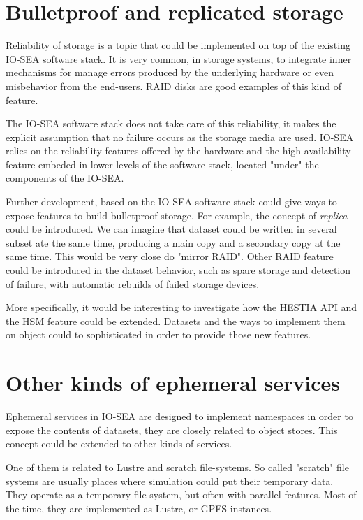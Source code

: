 \section{Bulletproof and replicated storage}

Reliability of storage is a topic that could be implemented on top of the existing IO-SEA software stack. It is
very common, in storage systems, to integrate inner mechanisms for manage errors produced by the underlying 
hardware or even misbehavior from the end-users. RAID disks are good examples of this kind of feature. 

The IO-SEA software stack does not take care of this reliability, it makes the explicit assumption that no
failure occurs as the storage media are used. IO-SEA relies on the reliability features offered by the hardware
and the high-availability feature embeded in lower levels of the software stack, located "under" the components
of the IO-SEA. 

Further development, based on the IO-SEA software stack could give ways to expose features to build bulletproof
storage. For example, the concept of \textit{replica} could be introduced. We can imagine that dataset could be
written in several subset ate the same time, producing a main copy and a secondary copy at the same time. This 
would be very close do "mirror RAID". Other RAID feature could be introduced in the dataset behavior, such as 
spare storage and detection of failure, with automatic rebuilds of failed storage devices. 

More specifically, it would be interesting to investigate how the HESTIA API and the HSM feature could be 
extended. Datasets and the ways to implement them on object could to sophisticated in order to provide those new
features. 

\section{Other kinds of ephemeral services}

Ephemeral services in IO-SEA are designed to implement namespaces in order to expose the contents of datasets, 
they are closely related to object stores. This concept could be extended to other kinds of services.

One of them is related to Lustre and scratch file-systems. So called "scratch" file systems are usually places 
where simulation could put their temporary data. They operate as a temporary file system, but often with parallel
features. Most of the time, they are implemented as Lustre, or GPFS instances. 

